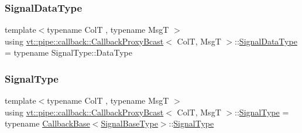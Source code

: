 \mbox{\label{structvt_1_1pipe_1_1callback_1_1_callback_proxy_bcast_ae26574a2b9198a4b4e427bbaab76de53}} 
\subsubsection{\texorpdfstring{Signal\+Data\+Type}{SignalDataType}}
{\footnotesize\ttfamily template$<$typename ColT , typename MsgT $>$ \\
using \hyperlink{structvt_1_1pipe_1_1callback_1_1_callback_proxy_bcast}{vt\+::pipe\+::callback\+::\+Callback\+Proxy\+Bcast}$<$ ColT, MsgT $>$\+::\hyperlink{structvt_1_1pipe_1_1callback_1_1_callback_proxy_bcast_ae26574a2b9198a4b4e427bbaab76de53}{Signal\+Data\+Type} =  typename Signal\+Type\+::\+Data\+Type}

\mbox{\label{structvt_1_1pipe_1_1callback_1_1_callback_proxy_bcast_a152bf72e620b884defce792be43860d2}} 
\subsubsection{\texorpdfstring{Signal\+Type}{SignalType}}
{\footnotesize\ttfamily template$<$typename ColT , typename MsgT $>$ \\
using \hyperlink{structvt_1_1pipe_1_1callback_1_1_callback_proxy_bcast}{vt\+::pipe\+::callback\+::\+Callback\+Proxy\+Bcast}$<$ ColT, MsgT $>$\+::\hyperlink{structvt_1_1pipe_1_1callback_1_1_callback_proxy_bcast_a152bf72e620b884defce792be43860d2}{Signal\+Type} =  typename \hyperlink{structvt_1_1pipe_1_1callback_1_1_callback_base}{Callback\+Base}$<$\hyperlink{structvt_1_1pipe_1_1callback_1_1_callback_proxy_bcast_a4ed994346a98d36d5d70c07a3d1e1dfb}{Signal\+Base\+Type}$>$\+::\hyperlink{structvt_1_1pipe_1_1callback_1_1_callback_proxy_bcast_a152bf72e620b884defce792be43860d2}{Signal\+Type}}



